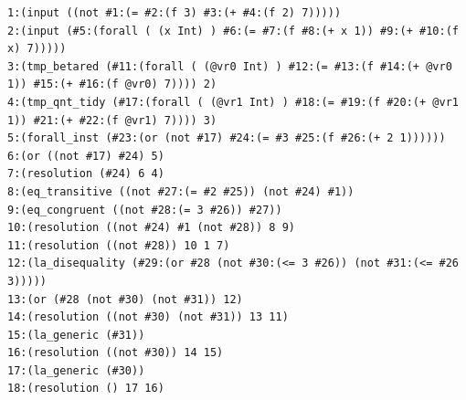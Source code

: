 \documentclass[11pt]{article}
\begin{document}
\begin{lstlisting}[frame=no]
1:(input ((not #1:(= #2:(f 3) #3:(+ #4:(f 2) 7)))))
2:(input (#5:(forall ( (x Int) ) #6:(= #7:(f #8:(+ x 1)) #9:(+ #10:(f x) 7)))))
3:(tmp_betared (#11:(forall ( (@vr0 Int) ) #12:(= #13:(f #14:(+ @vr0 1)) #15:(+ #16:(f @vr0) 7)))) 2)
4:(tmp_qnt_tidy (#17:(forall ( (@vr1 Int) ) #18:(= #19:(f #20:(+ @vr1 1)) #21:(+ #22:(f @vr1) 7)))) 3)
5:(forall_inst (#23:(or (not #17) #24:(= #3 #25:(f #26:(+ 2 1))))))
6:(or ((not #17) #24) 5)
7:(resolution (#24) 6 4)
8:(eq_transitive ((not #27:(= #2 #25)) (not #24) #1))
9:(eq_congruent ((not #28:(= 3 #26)) #27))
10:(resolution ((not #24) #1 (not #28)) 8 9)
11:(resolution ((not #28)) 10 1 7)
12:(la_disequality (#29:(or #28 (not #30:(<= 3 #26)) (not #31:(<= #26 3)))))
13:(or (#28 (not #30) (not #31)) 12)
14:(resolution ((not #30) (not #31)) 13 11)
15:(la_generic (#31))
16:(resolution ((not #30)) 14 15)
17:(la_generic (#30))
18:(resolution () 17 16)
\end{lstlisting}
\end{document}
